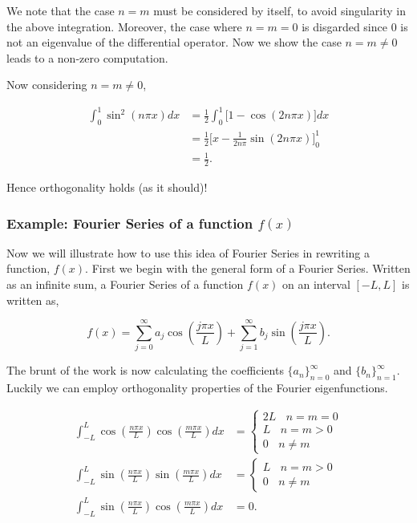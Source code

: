 \begin{itemize}
We note that the case $n=m$ must be considered by itself, to avoid singularity in the above integration. Moreover, the case where $n=m=0$ is disgarded since $0$ is not an eigenvalue of the differential operator. Now we show the case $n=m\neq 0$ leads to a non-zero computation. 

Now considering $n=m\neq 0$,

\begin{align*}
\int_0^1 \sin^2(n\pi x)dx &= \frac{1}{2} \int_0^1\Big[1 - \cos(2n\pi x)\Big] dx \\
%
&= \frac{1}{2} \Big[x - \frac{1}{2n\pi} \sin(2n\pi x) ]_0^1 \\
%
&= \frac{1}{2}.
\end{align*}

Hence orthogonality holds (as it should)!

\end{itemize}


%
%
%
%
\subsubsection{Example: Fourier Series of a function $f(x)$}

Now we will illustrate how to use this idea of Fourier Series in rewriting a function, $f(x)$. First we begin with the general form of a Fourier Series. Written as an infinite sum, a Fourier Series of a function $f(x)$ on an interval $[-L,L]$ is written as,

\begin{equation}
\label{fourier_series} f(x) = \sum_{j=0}^{\infty} a_j \cos\left( \frac{j\pi x}{L} \right ) +  \sum_{j=1}^{\infty} b_j \sin\left( \frac{j\pi x}{L} \right ).
\end{equation}

The brunt of the work is now calculating the coefficients $\{a_n\}_{n=0}^{\infty}$ and $\{b_n\}_{n=1}^{\infty}$. Luckily we can employ orthogonality properties of the Fourier eigenfunctions.

\begin{align}
\int_{-L}^L \cos\left( \frac{n\pi x}{L} \right ) \cos\left( \frac{m\pi x}{L}\right) dx &=\left\{\begin{array}{c}2L\ \ \ \ n=m=0 \\ L \ \ \ \ n=m>0 \\ 0 \ \ \ \ n\neq m \end{array}\right. \\
\int_{-L}^L \sin\left( \frac{n\pi x}{L} \right ) \sin\left( \frac{m\pi x}{L} \right) dx &= \left\{\begin{array}{c} L \ \ \ \ n=m>0 \\ 0 \ \ \ \ n\neq m \end{array}\right. \\
\int_{-L}^L \sin\left( \frac{n\pi x}{L} \right ) \cos\left( \frac{m\pi x}{L} \right) dx &= 0.
\end{align}

